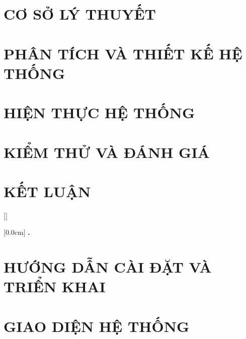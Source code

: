 \documentclass[a4paper,13pt,3p,twoside]{report}
\renewcommand{\bibname}{Danh_sach_tai_lieu_tham_khao}
\theoremstyle{definition}
\begin{document}
\newpage
\chapter{CƠ SỞ LÝ THUYẾT}


\newpage
\chapter{PHÂN TÍCH VÀ THIẾT KẾ HỆ THỐNG}


\newpage
\chapter{HIỆN THỰC HỆ THỐNG}


\newpage
\chapter{KIỂM THỬ VÀ ĐÁNH GIÁ}


\newpage
\chapter{KẾT LUẬN}


\newpage
\renewcommand\bibname{TÀI LIỆU THAM KHẢO}
\printbibliography
{}

\appendixpage
\appendix
\addappheadtotoc

[]
\titlespacing*{\chapter}{0pt}{-20pt}{20pt}

    [0.0cm]
    {\bfseries\vspace{0.3cm}}
    {{\bfseries{\scshape} \thecontentslabel.\ }}
    {}
    {\contentspage} 
    
\chapter{HƯỚNG DẪN CÀI ĐẶT VÀ TRIỂN KHAI}


\newpage
\chapter{GIAO DIỆN HỆ THỐNG}

\end{document}
